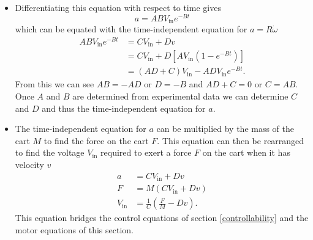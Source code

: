 \documentclass{article}
\begin{document}
\begin{itemize}
  \item Differentiating this equation with respect to time gives \[a = A B V_\text{in} e^{-B t}\] which can be equated with the time-independent equation for $a = R \dot{\omega}$ \begin{align*}
          A B V_\text{in} e^{-B t} & = C V_\text{in} + D v                               \\
                                   & = C V_\text{in} + D [A V_\text{in} (1 - e^{-B t})]  \\
                                   & = (A D + C) V_\text{in} - A D V_\text{in} e^{-B t}.
        \end{align*} From this we can see $A B = -A D$ or $D = - B$ and $A D + C = 0$ or $C = A B$. Once $A$ and $B$ are determined from experimental data we can determine $C$ and $D$ and thus the time-independent equation for $a$.

  \item The time-independent equation for $a$ can be multiplied by the mass of the cart $M$ to find the force on the cart $F$. This equation can then be rearranged to find the voltage $V_\text{in}$ required to exert a force $F$ on the cart when it has velocity $v$ \begin{align*}
          a           & = C V_\text{in} + D v                           \\
          F           & = M (C V_\text{in} + D v)                       \\
          V_\text{in} & = \frac{1}{C} \left( \frac{F}{M} - D v \right).
        \end{align*} This equation bridges the control equations of section \ref{controllability} and the motor equations of this section.
\end{itemize}
\end{document}
